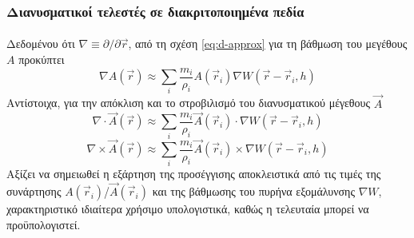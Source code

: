 \subsubsection{Διανυσματικοί τελεστές σε διακριτοποιημένα πεδία}
\label{sssec:vector-calc}
\paragraph{} Δεδομένου ότι $\nabla \equiv \partial/\partial\vec{r}$,
από τη σχέση \ref{eq:d-approx} για τη βάθμωση του μεγέθους $A$ προκύπτει
\begin{equation}
  \label{eq:d-grad}
  \nabla A(\vec{r}) \approx \sum_i \frac{m_i}{\rho_i} A(\vec{r}_i) \nabla W(\vec{r} - \vec{r}_i, h)
\end{equation}
Αντίστοιχα, για την απόκλιση και το στροβιλισμό του διανυσματικού μέγεθους $\vec{A}$
\begin{equation}
  \label{eq:d-div}
  \nabla \cdot \vec{A}(\vec{r}) \approx \sum_i \frac{m_i}{\rho_i} \vec{A}(\vec{r}_i)
  \cdot \nabla W(\vec{r} - \vec{r}_i, h)
\end{equation}
\begin{equation}
  \label{eq:d-curl}
  \nabla \times \vec{A}(\vec{r}) \approx \sum_i \frac{m_i}{\rho_i} \vec{A}(\vec{r}_i)
  \times \nabla W(\vec{r} - \vec{r}_i, h)
\end{equation}
Αξίζει να σημειωθεί η εξάρτηση της προσέγγισης αποκλειστικά από τις τιμές της συνάρτησης
$A(\vec{r}_i)$/$\vec{A}(\vec{r}_i)$ και της βάθμωσης του πυρήνα εξομάλυνσης $\nabla W$,
χαρακτηριστικό ιδιαίτερα χρήσιμο υπολογιστικά, καθώς η τελευταία μπορεί να προϋπολογιστεί.

